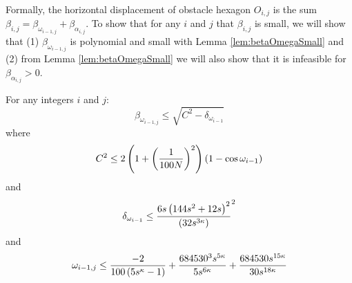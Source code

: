 Formally, the horizontal displacement of obstacle hexagon $O_{i,j}$ is the sum $\beta_{i,j} = \beta_{\omega_{i-1,j}} + \beta_{\alpha_{i,j}}$.  
To show that for any $i$ and $j$ that $\beta_{i,j}$ is small, we will show that (1) $\beta_{\omega_{i-1,j}}$ is polynomial and small with Lemma \ref{lem:betaOmegaSmall} and (2) from Lemma \ref{lem:betaOmegaSmall} we will also show that it is infeasible for $\beta_{\alpha_{i,j}} > 0$.  

\begin{lem}\label{lem:betaOmegaSmall}
For any integers $i$ and $j$: 
$$\beta_{\omega_{i-1,j}} \leq \sqrt{C^2 - \delta_{\omega_{i-1}}}$$
where 
$$C^2 \leq 2 \left( 1 + \left( \frac{1}{100N} \right)^2 \right) \left( 1 - \cos\omega_{i-1} \right)$$
and
$$\delta_{\omega_{i-1}} \leq \frac{6s\left( 144s^2+12s \right)^2}{\left( 32s^{3\kappa} \right)}^2 $$
and 
$$
\omega_{i-1,j} \leq \frac{-2}{100 \left( 5 s^\kappa - 1 \right)} + \frac{684530^3s^{5\kappa}}{ 5  s^{6 \kappa}} + \frac{684530s^{15\kappa}}{ 30  s^{18 \kappa}}
$$
\end{lem}

